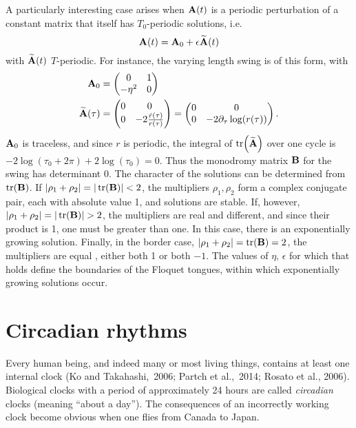 \documentclass[10pt,letter, swedish, english,%
]{article}
\begin{document}
A particularly interesting case arises when  $\vb{A}(t)$ is a periodic
perturbation of a constant matrix that itself has 
${T}_{0}${}-periodic solutions, i.e.
\begin{equation}
\vb{A}(t)={\vb{A}}_{0}+\epsilon \widetilde{{\vb{A}}}(t)
\end{equation}
with  $\widetilde{{\vb{A}}}(t)$  $T${}-periodic. For instance, the varying
length swing is of this form, with
\begin{equation}
\begin{aligned}
\vb{A}_0&=
\begin{pmatrix}0&1\\-{\eta }^{2}&0\end{pmatrix}
\\
\widetilde{{\vb{A}}}(\tau)&=
\begin{pmatrix}0&0\\
0&-2\frac{\dot{{r}}(\tau)}{r(\tau)}
\end{pmatrix}
=
\begin{pmatrix}0&0\\
0&-2\partial_{\tau}\log(r(\tau))
\end{pmatrix}.
\end{aligned}
\end{equation}
${\vb{A}}_{0}$ is traceless, and since  $r$ is periodic, the integral of 
$\tr(\widetilde{{\vb{A}}})$ over one cycle is  
$-2\log({\tau}_{0}+2\pi )+2\log({\tau }_{0})=0$. Thus the
monodromy matrix  $\vb{B}$ for the swing has determinant 0. The character
of the solutions can be determined from  $\tr(\vb{B})$.
If  $\abs{\rho_{1}+\rho_{2}}=|\tr(\vb{B})|<2$, the multipliers  
$\rho_{1},\rho_{2}$ form a complex conjugate pair, each with absolute
value 1, and solutions are stable. If, however,
$\abs{\rho_{1}+\rho_{2}}=|\tr(\vb{B})|>2$, the multipliers
are real and different, and since their product is 1, one must be
greater than one. In this case, there is an exponentially growing
solution. Finally, in the border case,  $|\rho_{1}+\rho_{2}|=\tr(\vb{B})=2$, the multipliers are equal
, either both 1 or both  $-1$. The values of  $\eta,\,\epsilon $ for
which that holds define the boundaries of the Floquet tongues, within
which exponentially growing solutions occur. 


\section{Circadian rhythms}
\newcommand{\PC}{P_{\text{C}}}
\newcommand{\PN}{P_{\text{N}}}
Every human being, and indeed many or most living things, contains at
least one internal clock (Ko and Takahashi,~2006; Partch et al.,~2014;
Rosato et al., 2006). Biological clocks with a period of 
approximately 24 hours are called \textit{circadian} clocks (meaning
“about a day”). The consequences of an incorrectly working clock
become obvious when one flies from Canada to Japan.
\end{document}
